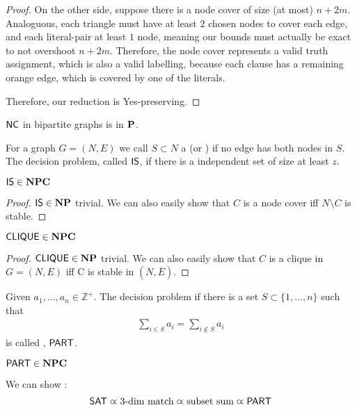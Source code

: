 \begin{proof}
    On the other side, suppose there is a node cover of size (at most) $n+2m$.
    Analoguous, each triangle must have at least $2$ chosen nodes to cover each edge, and each literal-pair at least $1$ node,
    meaning our bounds must actually be exact to not overshoot $n+2m$. Therefore, the node cover represents a valid truth assignment,
    which is also a valid labelling, because each clause has a remaining orange edge, which is covered by
    one of the literals.

    Therefore, our reduction is Yes-preserving.
\end{proof}
\begin{remark}
    $\mathsf{NC}$ in bipartite graphs is in $\mathbf{P}$.
\end{remark}
\begin{definition}
    For a graph $G= (N,E)$ we call $S \subset N$ a  (or ) if no edge has both nodes in $S$.
    The decision problem, called $\mathsf{IS}$, if there is a independent set of size at least $z$.
\end{definition}
\begin{theorem}
    $\mathsf{IS} \in \mathbf{NPC}$
\end{theorem}
\begin{proof}
    $\mathsf{IS} \in \mathbf{NP}$ trivial. We can also easily show that $C$ is a node cover iff $N \setminus C$ is stable.
\end{proof}
\begin{theorem}
    $\mathsf{CLIQUE} \in \mathbf{NPC}$
\end{theorem}
\begin{proof}
    $\mathsf{CLIQUE} \in \mathbf{NP}$ trivial. We can also easily show that $C$ is a clique in $G=(N,E)$ iff
    C is stable in $(N, \overline{E})$.
\end{proof}
\begin{definition}
    Given $a_1,...,a_n \in \mathbb{Z^+}$. The decision problem if there is a set $S \subset \{1,...,n\}$ such that
    \begin{align*}
        \sum_{i \in S}a_i = \sum_{i \not \in S}a_i
    \end{align*}
    is called , $\mathsf{PART}$.
\end{definition}
\begin{theorem}
    $\mathsf{PART} \in \mathbf{NPC}$
\end{theorem}
\begin{sketch}
    We can show \cite[Ch.~15.5]{comb-optimization-korte}:
    \begin{align*}
        \mathsf{SAT} \varpropto \text{3-dim match} \varpropto \text{subset sum} \varpropto \mathsf{PART}
    \end{align*}
\end{sketch}
